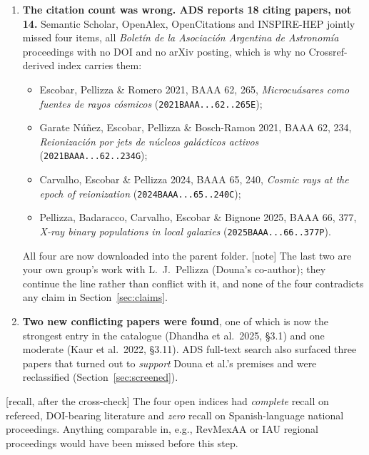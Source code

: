 \documentclass[11pt,a4paper]{article}
\newcommand{\flag}[1]{\textcolor{orange!75!black}{\textsf{\small [#1]}}}
\begin{document}
\begin{enumerate}[leftmargin=*,itemsep=3pt]
\item \textbf{The citation count was wrong. ADS reports 18 citing papers, not
      14.} Semantic Scholar, OpenAlex, OpenCitations and INSPIRE-HEP jointly
      missed four items, all \emph{Bolet\'in de la Asociaci\'on Argentina de
      Astronom\'ia} proceedings with no DOI and no arXiv posting, which is why
      no Crossref-derived index carries them:
      \begin{itemize}[leftmargin=1.2cm,itemsep=1pt]
      \item Escobar, Pellizza \& Romero 2021, BAAA 62, 265,
            \emph{Microcu\'asares como fuentes de rayos c\'osmicos}
            (\texttt{2021BAAA...62..265E});
      \item Garate N\'u\~nez, Escobar, Pellizza \& Bosch-Ramon 2021, BAAA 62, 234,
            \emph{Reionizaci\'on por jets de n\'ucleos gal\'acticos activos}
            (\texttt{2021BAAA...62..234G});
      \item Carvalho, Escobar \& Pellizza 2024, BAAA 65, 240,
            \emph{Cosmic rays at the epoch of reionization}
            (\texttt{2024BAAA...65..240C});
      \item Pellizza, Badaracco, Carvalho, Escobar \& Bignone 2025, BAAA 66, 377,
            \emph{X-ray binary populations in local galaxies}
            (\texttt{2025BAAA...66..377P}).
      \end{itemize}
      All four are now downloaded into the parent folder. \flag{note} The last
      two are your own group's work with L.~J.\ Pellizza (Douna's co-author);
      they continue the line rather than conflict with it, and none of the four
      contradicts any claim in Section~\ref{sec:claims}.
\item \textbf{Two new conflicting papers were found}, one of which is now the
      strongest entry in the catalogue (Dhandha et al.\ 2025, \S3.1) and one
      moderate (Kaur et al.\ 2022, \S3.11). ADS full-text search also surfaced
      three papers that turned out to \emph{support} Douna et al.'s premises
      and were reclassified (Section~\ref{sec:screened}).
\end{enumerate}

\noindent\flag{recall, after the cross-check} The four open indices had
\emph{complete} recall on refereed, DOI-bearing literature and \emph{zero}
recall on Spanish-language national proceedings. Anything comparable in, e.g.,
RevMexAA or IAU regional proceedings would have been missed before this step.
\end{document}
